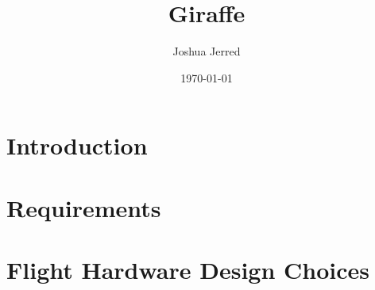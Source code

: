 \documentclass{report}[12pt,a4paper]
\title{Giraffe}
\author{Joshua Jerred}
\date{\today}
\begin{document}
\maketitle
\tableofcontents

\docstyle

\chapter{Introduction}


\chapter{Requirements}


\chapter{Flight Hardware Design Choices}
\end{document}
